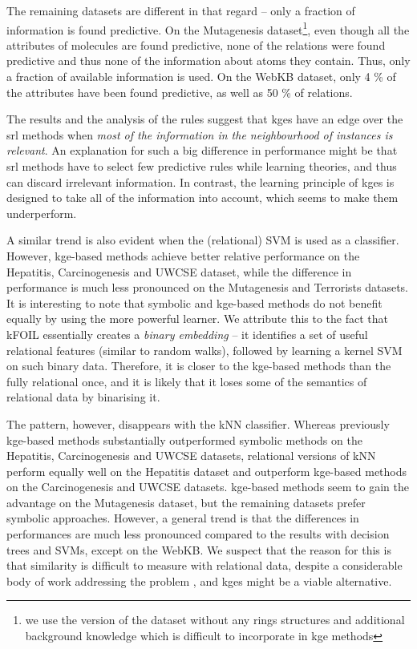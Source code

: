 The remaining datasets are different in that regard -- only a fraction of information is found predictive.
On the Mutagenesis dataset\footnote{we use the version of the dataset without any rings structures and additional background knowledge which is difficult to incorporate in \gls{kge} methods}, even though all the attributes of molecules are found predictive, none of the relations were found predictive and thus none of the information about atoms they contain.
Thus, only a fraction of available information is used.
On the WebKB dataset, only 4 \% of the attributes have been found predictive, as well as 50 \% of relations.



The results and the analysis of the rules suggest that \gls{kge}s have an edge over the \gls{srl} methods when \textit{most of the information in the neighbourhood of instances is relevant}.
An explanation for such a big difference in performance might be that \gls{srl} methods have to select few predictive rules while learning theories, and thus can discard irrelevant information.
In contrast, the learning principle of \gls{kge}s is designed to take all of the information into account, which seems to make them underperform.




A similar trend is also evident when the (relational) SVM is used as a classifier.
However, \gls{kge}-based methods achieve better relative performance on the Hepatitis, Carcinogenesis and UWCSE dataset, while the difference in performance is much less pronounced on the Mutagenesis and Terrorists datasets.
It is interesting to note that symbolic and \gls{kge}-based methods do not benefit equally by using the more powerful learner.
We attribute this to the fact that kFOIL essentially creates a \textit{binary embedding} -- it identifies a set of useful relational features (similar to random walks), followed by learning a kernel SVM on such binary data.
Therefore,  it is closer to the \gls{kge}-based methods than the fully relational once, and it is likely that it loses some of the semantics of relational data by binarising it.



The pattern, however, disappears with the kNN classifier.
Whereas previously \gls{kge}-based methods substantially outperformed symbolic methods on the Hepatitis, Carcinogenesis and UWCSE datasets, relational versions of kNN perform equally well on the Hepatitis dataset and outperform \gls{kge}-based methods on the Carcinogenesis and UWCSE datasets.
\gls{kge}-based methods seem to gain the advantage on the Mutagenesis dataset, but the remaining datasets prefer symbolic approaches.
However, a general trend is that the differences in performances are much less pronounced compared to the results with decision trees and SVMs, except on the WebKB.
We suspect that the reason for this is that similarity is difficult to measure with relational data, despite a considerable body of work addressing the problem \cite{Dumancic2017a}, and \gls{kge}s might be a viable alternative.




